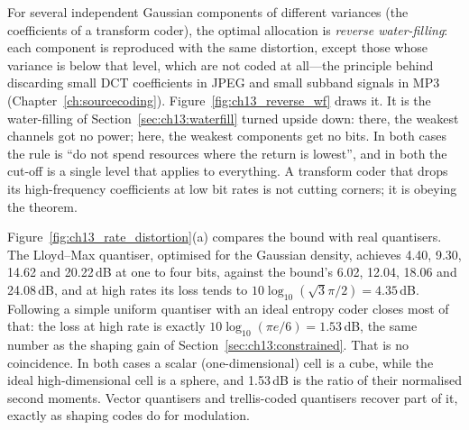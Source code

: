 
For several independent Gaussian components of different variances (the coefficients of a
transform coder), the optimal allocation is \emph{reverse water-filling}: each component is
reproduced with the same distortion, except those whose variance is below that level, which are
not coded at all---the principle behind discarding small DCT coefficients in JPEG and small subband
signals in MP3 (Chapter~\ref{ch:sourcecoding}). Figure~\ref{fig:ch13_reverse_wf} draws it. It is
the water-filling of Section~\ref{sec:ch13:waterfill} turned upside down: there, the weakest
channels got no power; here, the weakest components get no bits. In both cases the rule is ``do
not spend resources where the return is lowest'', and in both the cut-off is a single level that
applies to everything. A transform coder that drops its high-frequency coefficients at low bit
rates is not cutting corners; it is obeying the theorem.


Figure~\ref{fig:ch13_rate_distortion}(a) compares the bound with real quantisers. The Lloyd--Max
quantiser, optimised for the Gaussian density, achieves 4.40, 9.30, 14.62 and 20.22\,dB at one to four
bits, against the bound's 6.02, 12.04, 18.06 and 24.08\,dB, and at high rates its loss tends to
$10\log_{10}(\sqrt3\pi/2)=4.35$\,dB. Following a simple uniform quantiser with an ideal entropy coder
closes most of that: the loss at high rate is exactly $10\log_{10}(\pi e/6)=1.53$\,dB, the same number
as the shaping gain of Section~\ref{sec:ch13:constrained}. That is no coincidence. In both cases a
scalar (one-dimensional) cell is a cube, while the ideal high-dimensional cell is a sphere, and
1.53\,dB is the ratio of their normalised second moments. Vector quantisers and trellis-coded
quantisers recover part of it, exactly as shaping codes do for modulation.

